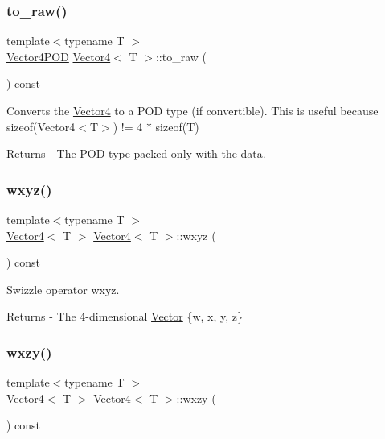 \subsubsection{\texorpdfstring{to\+\_\+raw()}{to\_raw()}}
{\footnotesize\ttfamily template$<$typename T $>$ \\
\mbox{\hyperlink{struct_vector4_p_o_d}{Vector4\+P\+OD}} \mbox{\hyperlink{class_vector4}{Vector4}}$<$ T $>$\+::to\+\_\+raw (\begin{DoxyParamCaption}{ }\end{DoxyParamCaption}) const}

Converts the \mbox{\hyperlink{class_vector4}{Vector4}} to a P\+OD type (if convertible). This is useful because sizeof(\+Vector4$<$\+T$>$) != 4 $\ast$ sizeof(\+T) \begin{DoxyReturn}{Returns}
-\/ The P\+OD type packed only with the data. 
\end{DoxyReturn}
\mbox{\label{class_vector4_afc590c08279fd1302d3f03758fff67ea}} 
\subsubsection{\texorpdfstring{wxyz()}{wxyz()}}
{\footnotesize\ttfamily template$<$typename T $>$ \\
\mbox{\hyperlink{class_vector4}{Vector4}}$<$ T $>$ \mbox{\hyperlink{class_vector4}{Vector4}}$<$ T $>$\+::wxyz (\begin{DoxyParamCaption}{ }\end{DoxyParamCaption}) const}

Swizzle operator wxyz. \begin{DoxyReturn}{Returns}
-\/ The 4-\/dimensional \mbox{\hyperlink{class_vector}{Vector}} \{w, x, y, z\} 
\end{DoxyReturn}
\mbox{\label{class_vector4_a5eca626d3f954645d0524e906692871f}} 
\subsubsection{\texorpdfstring{wxzy()}{wxzy()}}
{\footnotesize\ttfamily template$<$typename T $>$ \\
\mbox{\hyperlink{class_vector4}{Vector4}}$<$ T $>$ \mbox{\hyperlink{class_vector4}{Vector4}}$<$ T $>$\+::wxzy (\begin{DoxyParamCaption}{ }\end{DoxyParamCaption}) const}

